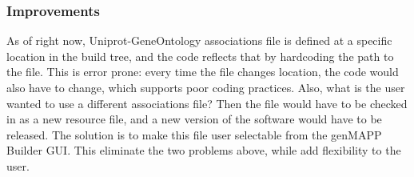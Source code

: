 \subsubsection{Improvements}
As of right now, Uniprot-GeneOntology associations file is defined at a specific location in the build tree,
and the code reflects that by hardcoding the path to the file. This is error prone: every time the file changes location,
the code would also have to change, which supports poor coding practices. Also, what is the user wanted to use a different
associations file? Then the file would have to be checked in as a new resource file, and a new version of the software would have
to be released. The solution is to make this file user selectable from the genMAPP Builder GUI. This eliminate the two problems
above, while add flexibility to the user.
